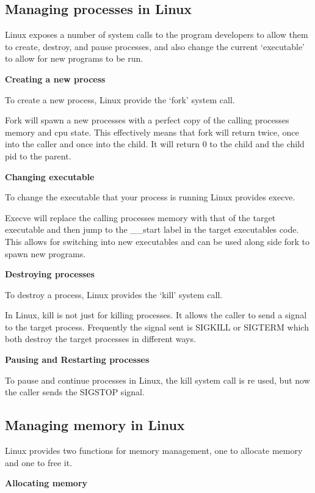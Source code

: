 \documentclass[a4paper]{report}
\begin{document}
\subsection{Managing processes in Linux}

Linux exposes a number of system calls to the program developers to allow them to create, destroy, and pause processes, and also change the current `executable' to allow for new programs to be run.

\noindent
\textbf{Creating a new process}

To create a new process, Linux provide the `fork' system call.

Fork will spawn a new processes with a perfect copy of the calling processes memory and cpu state. This effectively means that fork will return twice, once into the caller and once into the child. It will return 0 to the child and the child pid to the parent.

\noindent
\textbf{Changing executable}

To change the executable that your process is running Linux provides execve.

Execve will replace the calling processes memory with that of the target executable and then jump to the \_\_start label in the target executables code. This allows for switching into new executables and can be used along side fork to spawn new programs.

\noindent
\textbf{Destroying processes}

To destroy a process, Linux provides the `kill' system call.

In Linux, kill is not just for killing processes. It allows the caller to send a signal to the target process. Frequently the signal sent is SIGKILL or SIGTERM which both destroy the target processes in different ways.

\noindent
\textbf{Pausing and Restarting processes}

To pause and continue processes in Linux, the kill system call is re used, but now the caller sends the SIGSTOP signal.

\subsection{Managing memory in Linux}

Linux provides two functions for memory management, one to allocate memory and one to free it.

\noindent
\textbf{Allocating memory}
\end{document}
